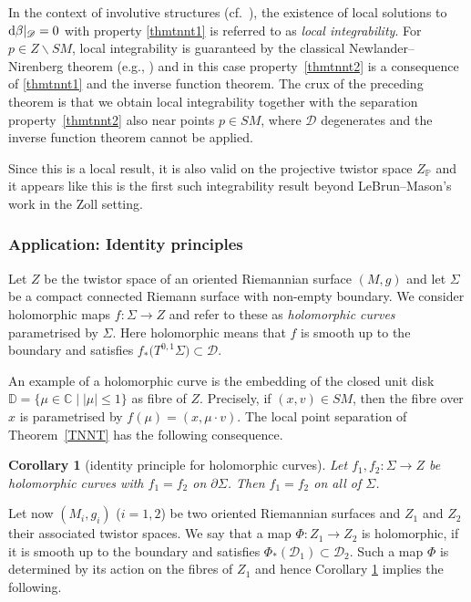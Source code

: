 \documentclass[pdftex]{sigma}
\numberwithin{equation}{section}
\newtheorem{Corollary}[Theorem]{Corollary}
\theoremstyle{definition}
\newcommand{\C}{\mathbb{C}} %
\newcommand{\DD}{\mathbb{D}} %
\newcommand{\1}{{\bf 1}}
\newcommand{\D}{\mathscr{D}}
\begin{document}
In the context of involutive structures (cf.~\cite{Tre92}), the existence of local solutions to ${\rm d}\beta|_{\D} = 0$ with property \ref{thmtnnt1} is referred to as {\it local integrability}. For $p\in Z\backslash SM$, local integrability is guaranteed by the classical Newlander--Nirenberg theorem (e.g., \cite[Theorem~2.6.19]{Huy05}) and in this case property~\ref{thmtnnt2} is a consequence of \ref{thmtnnt1} and the inverse function theorem. The crux of the preceding theorem is that we obtain local integrability together with the separation property~\ref{thmtnnt2} also near points $p\in SM$, where $\D$ degenerates and the inverse function theorem cannot be applied.

 Since this is a local result, it is also valid on the projective twistor space $Z_\mathbb P$ and it appears like this is the first such integrability result beyond LeBrun--Mason's work in the Zoll setting.

\subsubsection{Application: Identity principles} Let $Z$ be the twistor space of an oriented Riemannian surface $(M,g)$ and let $\Sigma$ be a compact connected Riemann surface with non-empty boundary. We consider holomorphic maps
${f\colon \Sigma\rightarrow Z}$
and refer to these as {\it holomorphic curves} parametrised by $\Sigma$. Here holomorphic means that $f$ is smooth up to the boundary and satisfies $f_*\bigl(T^{0,1}\Sigma\bigr)\subset \mathscr D$.

An example of a holomorphic curve is the embedding of the closed unit disk $\DD=\{\mu\in \C\mid |\mu|\le 1\}$ as fibre of $Z$. Precisely, if $(x,v)\in SM$, then the fibre over $x$ is parametrised by $f(\mu)=(x,\mu\cdot v)$. The local point separation of Theorem~\ref{TNNT} has the following consequence.

\begin{Corollary}[identity principle for holomorphic curves]\label{cor_curves}
Let $f_1,f_2\colon \Sigma\rightarrow Z$ be holomorphic curves with $f_1=f_2$ on $\partial \Sigma$. Then $f_1=f_2$ on all of $\Sigma$.
\end{Corollary}

Let now $(M_i,g_i)$ ($i=1,2$) be two oriented Riemannian surfaces and $Z_1$ and $Z_2$ their associated twistor spaces. We say that a map $\Phi\colon Z_1\rightarrow Z_2$ is holomorphic, if it is smooth up to the boundary and satisfies $\Phi_*(\mathscr D_1)\subset \mathscr{D}_2$. Such a map $\Phi$ is determined by its action on the fibres of $Z_1$ and hence Corollary \ref{cor_curves} implies the following.
\end{document}

